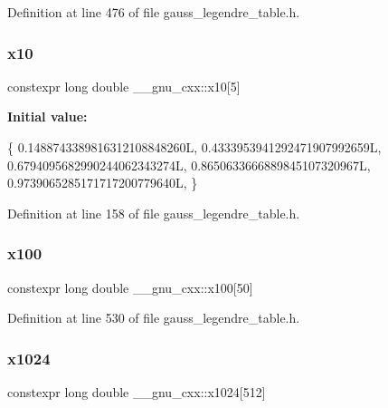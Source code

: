 Definition at line 476 of file gauss\+\_\+legendre\+\_\+table.\+h.

\mbox{\label{namespace____gnu__cxx_a35531eb9204fa50829339f7eccad5608}} 
\subsubsection{\texorpdfstring{x10}{x10}}
{\footnotesize\ttfamily constexpr long double \+\_\+\+\_\+gnu\+\_\+cxx\+::x10\mbox{[}5\mbox{]}}

{\bfseries Initial value\+:}
\begin{DoxyCode}
\{
    0.1488743389816312108848260L,
    0.4333953941292471907992659L,
    0.6794095682990244062343274L,
    0.8650633666889845107320967L,
    0.9739065285171717200779640L,
  \}
\end{DoxyCode}


Definition at line 158 of file gauss\+\_\+legendre\+\_\+table.\+h.

\mbox{\label{namespace____gnu__cxx_aee5c867dcae0fbf93848dfec3a7916ac}} 
\subsubsection{\texorpdfstring{x100}{x100}}
{\footnotesize\ttfamily constexpr long double \+\_\+\+\_\+gnu\+\_\+cxx\+::x100\mbox{[}50\mbox{]}}



Definition at line 530 of file gauss\+\_\+legendre\+\_\+table.\+h.

\mbox{\label{namespace____gnu__cxx_a8e7f775ca42fef340881a24cd9ff921c}} 
\subsubsection{\texorpdfstring{x1024}{x1024}}
{\footnotesize\ttfamily constexpr long double \+\_\+\+\_\+gnu\+\_\+cxx\+::x1024\mbox{[}512\mbox{]}}



